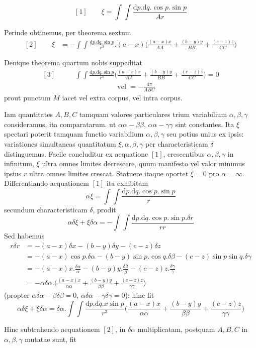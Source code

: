 \[
[1]\qquad \xi=\int\!\int\frac{\mathrm{d}p.\mathrm{d}q.\cos p.\sin p}{Ar}
\]
\par
Perinde obtinemus, per theorema sextum
\[
\begin{aligned}
[2]\qquad \xi&=-\int\!\int\frac{\mathrm{d}p.\mathrm{d}q.\sin p}{r^3}.(a-x)\bigl(\frac{(a-x)x}{AA}+\frac{(b-y)y}{BB}+\frac{(c-z)z}{CC}\bigr)
\end{aligned}
\]
\par
Denique theorema quartum nobis suppeditat
\[
\begin{aligned}
[3]\qquad &\int\!\int\frac{\mathrm{d}p.\mathrm{d}q.\sin p}{r^3}\bigl(\frac{(a-x)x}{AA}+\frac{(b-y)y}{BB}+\frac{(c-z)z}{CC}\bigr)=0\\
&\hspace{6em}\text{vel }=-\frac{4\pi}{ABC}
\end{aligned}
\]
prout punctum $M$ iacet vel extra corpus, vel intra corpus.

Iam quantitates $A,B,C$ tamquam valores particulares trium variabilium $\alpha,\beta,\gamma$ consideramus, ita comparatarum. ut $\alpha\alpha-\beta\beta$, $\alpha\alpha-\gamma\gamma$ sint constantes. Ita $\xi$ spectari poterit tamquam functio variabilium $\alpha,\beta,\gamma$ seu potius unius ex ipsis: variationes simultaneas quantitatum $\xi,\alpha,\beta,\gamma$ per characteristicam $\delta$ distinguemus. Facile concluditur ex aequatione $[1]$, crescentibus $\alpha,\beta,\gamma$ in infinitum, $\xi$ ultra omnes limites decrescere, quum manifesto vel valor minimus ipsius $r$ ultra omnes limites crescat. Statuere itaque oportet $\xi=0$ pro $\alpha=\infty$. Differentiando aequationem $[1]$ ita exhibitam
\[
\alpha\xi=\int\!\int\frac{\mathrm{d}p.\mathrm{d}q.\cos p.\sin p}{r}
\]
secundum characteristicam $\delta$, prodit
\[
\alpha\delta\xi+\xi\delta\alpha=-\int\!\int\frac{\mathrm{d}p.\mathrm{d}q.\cos p.\sin p.\delta r}{rr}
\]
Sed habemus
\[
\begin{aligned}
r\delta r&=-(a-x)\delta x-(b-y)\delta y-(c-z)\delta z\\
&=-(a-x)\cos p.\delta\alpha-(b-y)\sin p.\cos q.\delta\beta-(c-z)\sin p\sin q.\delta\gamma\\
&=-(a-x)x.\frac{\delta\alpha}{\alpha}-(b-y)y.\frac{\delta\beta}{\beta}-(c-z)z.\frac{\delta\gamma}{\gamma}\\
&=-\alpha\delta\alpha.\bigl(\frac{(a-x)x}{\alpha\alpha}+\frac{(b-y)y}{\beta\beta}+\frac{(c-z)z}{\gamma\gamma}\bigr)
\end{aligned}
\]
(propter $\alpha\delta\alpha-\beta\delta\beta=0$, $\alpha\delta\alpha-\gamma\delta\gamma=0$): hinc fit
\[
\alpha\delta\xi+\xi\delta\alpha=\delta\alpha.\int\!\int\frac{\mathrm{d}p.\mathrm{d}q.x\sin p}{r^3}\bigl(\frac{(a-x)x}{\alpha\alpha}+\frac{(b-y)y}{\beta\beta}+\frac{(c-z)z}{\gamma\gamma}\bigr)
\]
\par
Hinc subtrahendo aequationem $[2]$, in $\delta\alpha$ multiplicatam, postquam $A,B,C$ in $\alpha,\beta,\gamma$ mutatae sunt, fit
